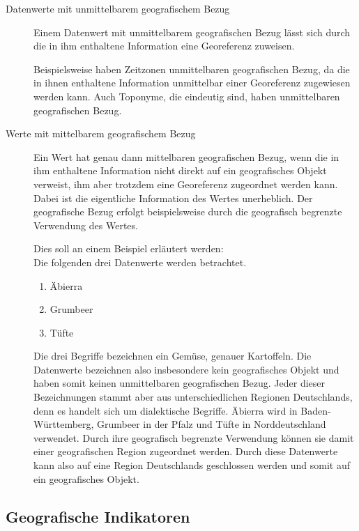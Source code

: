 			\begin{description}
				\item[Datenwerte mit unmittelbarem geografischem Bezug]

					Einem Datenwert mit unmittelbarem geografischen Bezug lässt sich durch die in ihm enthaltene Information eine Georeferenz zuweisen.	

					Beispielsweise haben Zeitzonen unmittelbaren geografischen Bezug, da die in ihnen enthaltene Information unmittelbar einer Georeferenz zugewiesen werden kann.
					Auch Toponyme, die eindeutig sind, haben unmittelbaren geografischen Bezug.

				\item[Werte mit mittelbarem geografischem Bezug] 

					Ein Wert hat genau dann mittelbaren geografischen Bezug, wenn die in ihm enthaltene Information nicht direkt auf ein geografisches Objekt verweist, ihm aber trotzdem eine Georeferenz zugeordnet werden kann.
					Dabei ist die eigentliche Information des Wertes unerheblich. 
					Der geografische Bezug erfolgt beispielsweise durch die geografisch begrenzte Verwendung des Wertes. 

					Dies soll an einem Beispiel erläutert werden:\\
					Die folgenden drei Datenwerte werden betrachtet.

					\begin{enumerate}
					 	\item Äbierra
					 	\item Grumbeer
					 	\item Tüfte 
					 \end{enumerate} 

					Die drei Begriffe bezeichnen ein Gemüse, genauer Kartoffeln.
					Die Datenwerte bezeichnen also insbesondere kein geografisches Objekt und haben somit keinen unmittelbaren geografischen Bezug.
					Jeder dieser Bezeichnungen stammt aber aus unterschiedlichen Regionen Deutschlands, denn es handelt sich um dialektische Begriffe.
					Äbierra wird in Baden-Württemberg, Grumbeer in der Pfalz und Tüfte in Norddeutschland verwendet.
					Durch ihre geografisch begrenzte Verwendung können sie damit einer geografischen Region zugeordnet werden.
					Durch diese Datenwerte kann also auf eine Region Deutschlands geschlossen werden und somit auf ein geografisches Objekt.

			\end{description}

		\subsection{Geografische Indikatoren}

